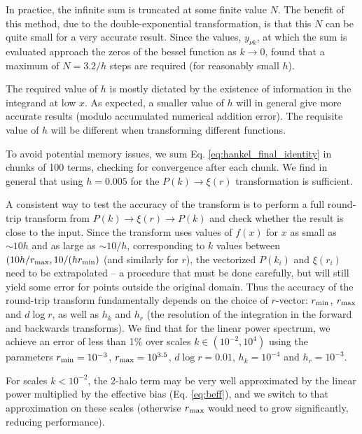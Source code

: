\documentclass[5p,aas_macros]{elsarticle}
\begin{document}
In practice, the infinite sum is truncated at some finite value $N$. 
The benefit of this method, due to the double-exponential transformation, is that this $N$ can be quite small for a very accurate result. 
Since the values, $y_{\nu k}$, at which the sum is evaluated approach the zeros of the bessel function as $k \rightarrow 0$, \citet{Murray2019} found that a maximum of $N=3.2/h$ steps are required (for reasonably small $h$).

 The required value of $h$ is mostly dictated by the existence of information in the integrand at low $x$. As expected, a smaller value of $h$ will in general give more accurate results (modulo accumulated numerical addition error). The requisite value of $h$ will be different when transforming 
 different functions. 
 
 To avoid potential memory issues, we sum Eq. \ref{eq:hankel_final_identity} in chunks of 100 terms, checking for convergence after each chunk.
 We find in general that using $h=0.005$ for the $P(k) \rightarrow \xi(r)$ transformation is sufficient. 
 
 A consistent way to test the accuracy of the transform is to perform a full round-trip transform from $P(k) \rightarrow \xi(r) \rightarrow P(k)$ and check whether the result is close to the input.
 Since the transform uses values of $f(x)$ for $x$ as small as $\sim 10h$ and as large as $\sim 10/h$, corresponding to $k$ values between $(10 h / r_{\rm max}, 10/(h r_{\rm min})$ (and similarly for $r$),
 the vectorized $P(k_i)$ and $\xi(r_i)$ need to be extrapolated -- a procedure that must be done carefully, but will still yield some error for points outside the original domain.
 Thus the accuracy of the round-trip transform fundamentally depends on the choice of $r$-vector: $r_{\rm min}$, $r_{\rm max}$ and $d\log r$, as well as $h_k$ and $h_r$ (the resolution of the integration in the forward and backwards transforms). 
 We find that for the linear power spectrum, we achieve an error of less than 1\% over scales $k \in (10^{-2}, 10^4)$ using the parameters $r_{\rm min} = 10^{-3}$, $r_{\rm max} = 10^{3.5}$, $d\log r = 0.01$, $h_k = 10^{-4}$ and $h_r = 10^{-3}$.
 
 For scales $k < 10^{-2}$, the 2-halo term may be very well approximated by the linear power multiplied by the effective bias (Eq. \ref{eq:beff}), and we switch to that approximation on these scales (otherwise $r_{\rm max}$ would need to grow significantly, reducing performance).
 
\end{document}
